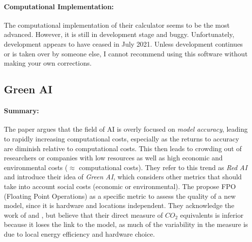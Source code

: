 \paragraph{Computational Implementation:} The computational implementation of their
calculator seems to be the most advanced. However, it is still in development stage and
buggy. Unfortunately, development appears to have ceased in July 2021. Unless
development continues or is taken over by someone else, I cannot recommend using this
software without making your own corrections.


\subsection{Green AI}
\centerline{}
\vspace{1em}

\paragraph{Summary:} The paper argues that the field of AI is overly focused on
\emph{model accuracy}, leading to rapidly increasing computational costs, especially as
the returns to accuracy are diminish relative to computational costs. This then leads to
crowding out of researchers or companies with low resources as well as high economic and
environmental costs ($\approx$ computational costs). They refer to this trend as
\emph{Red AI} and introduce their idea of \emph{Green AI}, which considers other metrics
that should take into account social costs (economic or environmental). The propose FPO
(Floating Point Operations) as a specific metric to assess the quality of a new model,
since it is hardware and locations independent. They acknowledge the work of
 and , but believe that their direct measure
of $CO_2$ equivalents is inferior because it loses the link to the model, as much of the
variability in the measure is due to local energy efficiency and hardware choice.